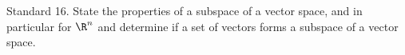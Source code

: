 Standard 16. State the properties of a subspace of a vector space, and in particular for $\R^n$ and determine if a set of vectors forms a subspace of a vector space.


\ifprintanswers
\else %
 \newpage
\fi

\begin{solution}
   
\end{solution}